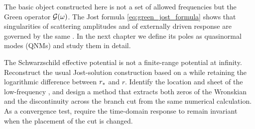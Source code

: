 The basic object constructed here is not a set of allowed frequencies but the Green operator $\mathcal{G}(\omega)$. The Jost formula \eqref{eq:green_jost_formula} shows that singularities of scattering amplitudes and of externally driven response are governed by the same . In the next chapter we define its poles as quasinormal modes (QNMs) and study them in detail.

\begin{researchproblem}
The Schwarzschild effective potential is not a finite-range potential at infinity. Reconstruct the usual Jost-solution construction based on a  while retaining the logarithmic difference between $r_*$ and $r$. Identify the location and sheet of the low-frequency , and design a method that extracts both zeros of the Wronskian and the discontinuity across the branch cut from the same numerical calculation. As a convergence test, require the time-domain response to remain invariant when the placement of the cut is changed.
\end{researchproblem}
